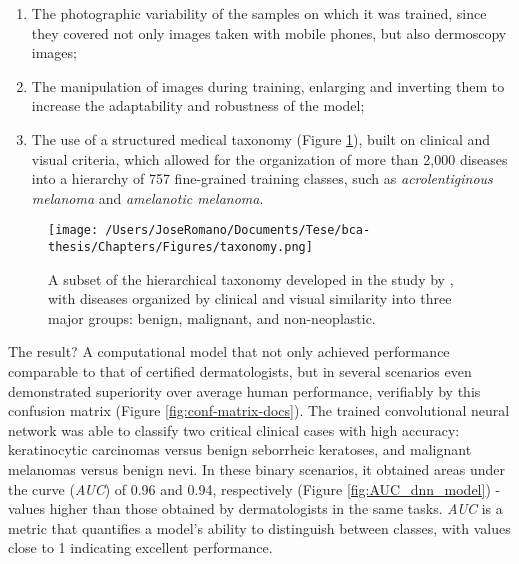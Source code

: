 \begin{enumerate}
  \item The photographic variability of the samples on which it was trained, since they
        covered not only images taken with mobile phones, but also dermoscopy images;

  \item The manipulation of images during training, enlarging and inverting them to
        increase the adaptability and robustness of the model;

  \item The use of a structured medical taxonomy (Figure \ref{fig:taxonomy}), built on
        clinical and visual criteria, which allowed for the organization of more than
        2{,}000 diseases into a hierarchy of 757 fine-grained training classes, such as
        \textit{acrolentiginous melanoma} and \textit{amelanotic melanoma}.
\end{enumerate}

\begin{figure}[htbp]
  \centering
  \texttt{[image: /Users/JoseRomano/Documents/Tese/bca-thesis/Chapters/Figures/taxonomy.png]}
  \caption{A subset of the hierarchical taxonomy developed in the study by \textcite{ai_in_dermacancer_esteva2017}, with diseases organized by clinical and visual similarity into three major groups: benign, malignant, and non-neoplastic.}
  \label{fig:taxonomy}
\end{figure}

The result? A computational model that not only achieved performance comparable
to that of certified dermatologists, but in several scenarios even demonstrated
superiority over average human performance, verifiably by this confusion matrix
(Figure \ref{fig:conf-matrix-docs}). The trained convolutional neural network
was able to classify two critical clinical cases with high accuracy:
keratinocytic carcinomas versus benign seborrheic keratoses, and malignant
melanomas versus benign nevi. In these binary scenarios, it obtained areas
under the curve (\textit{AUC}) of 0.96 and 0.94, respectively (Figure
\ref{fig:AUC_dnn_model}) - values higher than those obtained by dermatologists
in the same tasks. \textit{AUC} is a metric that quantifies a model's ability
to distinguish between classes, with values close to 1 indicating excellent
performance.

